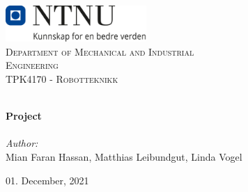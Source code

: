
\begin{titlepage}
\vbox{ }
\vbox{ }
\begin{center}
\includegraphics[width=0.40\textwidth]{Images/NTNU_logo.png}\\[1cm]
\textsc{\LARGE Department of Mechanical and Industrial }\\[0.5cm]
\textsc{\LARGE Engineering }\\[1.5cm]
\textsc{\Large TPK4170 - Robotteknikk}\\[0.5cm]
\vbox{ }

\HRule \\[0.4cm]
{ \huge \bfseries Project}\\[0.4cm]
\HRule \\[1.5cm]

\large
\emph{Author:}\\
Mian Faran Hassan, Matthias Leibundgut, Linda Vogel
\vfill

{\large 01. December, 2021}
\end{center}
\end{titlepage}